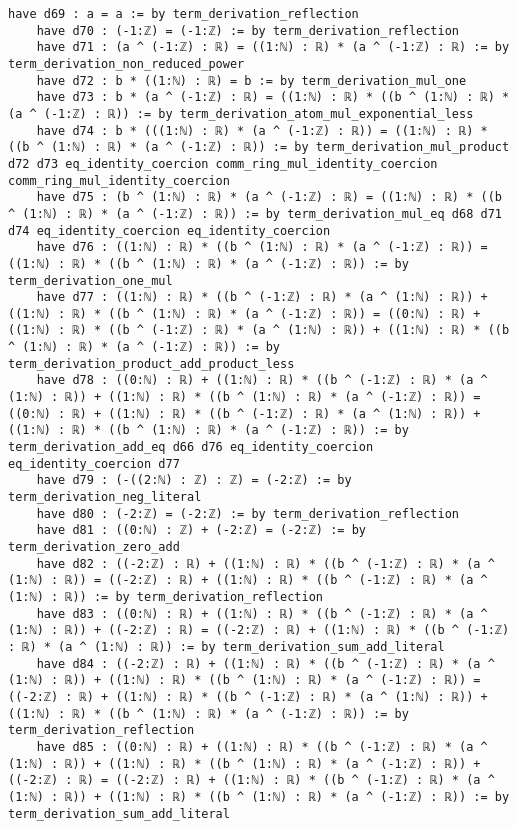 \documentclass{article}
\begin{document}
\begin{tcolorbox}[colback=white!10, width=\linewidth]
\begin{lstlisting}[language=Lean4]
    have d69 : a = a := by term_derivation_reflection
    have d70 : (-1:ℤ) = (-1:ℤ) := by term_derivation_reflection
    have d71 : (a ^ (-1:ℤ) : ℝ) = ((1:ℕ) : ℝ) * (a ^ (-1:ℤ) : ℝ) := by term_derivation_non_reduced_power
    have d72 : b * ((1:ℕ) : ℝ) = b := by term_derivation_mul_one
    have d73 : b * (a ^ (-1:ℤ) : ℝ) = ((1:ℕ) : ℝ) * ((b ^ (1:ℕ) : ℝ) * (a ^ (-1:ℤ) : ℝ)) := by term_derivation_atom_mul_exponential_less
    have d74 : b * (((1:ℕ) : ℝ) * (a ^ (-1:ℤ) : ℝ)) = ((1:ℕ) : ℝ) * ((b ^ (1:ℕ) : ℝ) * (a ^ (-1:ℤ) : ℝ)) := by term_derivation_mul_product d72 d73 eq_identity_coercion comm_ring_mul_identity_coercion comm_ring_mul_identity_coercion
    have d75 : (b ^ (1:ℕ) : ℝ) * (a ^ (-1:ℤ) : ℝ) = ((1:ℕ) : ℝ) * ((b ^ (1:ℕ) : ℝ) * (a ^ (-1:ℤ) : ℝ)) := by term_derivation_mul_eq d68 d71 d74 eq_identity_coercion eq_identity_coercion
    have d76 : ((1:ℕ) : ℝ) * ((b ^ (1:ℕ) : ℝ) * (a ^ (-1:ℤ) : ℝ)) = ((1:ℕ) : ℝ) * ((b ^ (1:ℕ) : ℝ) * (a ^ (-1:ℤ) : ℝ)) := by term_derivation_one_mul
    have d77 : ((1:ℕ) : ℝ) * ((b ^ (-1:ℤ) : ℝ) * (a ^ (1:ℕ) : ℝ)) + ((1:ℕ) : ℝ) * ((b ^ (1:ℕ) : ℝ) * (a ^ (-1:ℤ) : ℝ)) = ((0:ℕ) : ℝ) + ((1:ℕ) : ℝ) * ((b ^ (-1:ℤ) : ℝ) * (a ^ (1:ℕ) : ℝ)) + ((1:ℕ) : ℝ) * ((b ^ (1:ℕ) : ℝ) * (a ^ (-1:ℤ) : ℝ)) := by term_derivation_product_add_product_less
    have d78 : ((0:ℕ) : ℝ) + ((1:ℕ) : ℝ) * ((b ^ (-1:ℤ) : ℝ) * (a ^ (1:ℕ) : ℝ)) + ((1:ℕ) : ℝ) * ((b ^ (1:ℕ) : ℝ) * (a ^ (-1:ℤ) : ℝ)) = ((0:ℕ) : ℝ) + ((1:ℕ) : ℝ) * ((b ^ (-1:ℤ) : ℝ) * (a ^ (1:ℕ) : ℝ)) + ((1:ℕ) : ℝ) * ((b ^ (1:ℕ) : ℝ) * (a ^ (-1:ℤ) : ℝ)) := by term_derivation_add_eq d66 d76 eq_identity_coercion eq_identity_coercion d77
    have d79 : (-((2:ℕ) : ℤ) : ℤ) = (-2:ℤ) := by term_derivation_neg_literal
    have d80 : (-2:ℤ) = (-2:ℤ) := by term_derivation_reflection
    have d81 : ((0:ℕ) : ℤ) + (-2:ℤ) = (-2:ℤ) := by term_derivation_zero_add
    have d82 : ((-2:ℤ) : ℝ) + ((1:ℕ) : ℝ) * ((b ^ (-1:ℤ) : ℝ) * (a ^ (1:ℕ) : ℝ)) = ((-2:ℤ) : ℝ) + ((1:ℕ) : ℝ) * ((b ^ (-1:ℤ) : ℝ) * (a ^ (1:ℕ) : ℝ)) := by term_derivation_reflection
    have d83 : ((0:ℕ) : ℝ) + ((1:ℕ) : ℝ) * ((b ^ (-1:ℤ) : ℝ) * (a ^ (1:ℕ) : ℝ)) + ((-2:ℤ) : ℝ) = ((-2:ℤ) : ℝ) + ((1:ℕ) : ℝ) * ((b ^ (-1:ℤ) : ℝ) * (a ^ (1:ℕ) : ℝ)) := by term_derivation_sum_add_literal
    have d84 : ((-2:ℤ) : ℝ) + ((1:ℕ) : ℝ) * ((b ^ (-1:ℤ) : ℝ) * (a ^ (1:ℕ) : ℝ)) + ((1:ℕ) : ℝ) * ((b ^ (1:ℕ) : ℝ) * (a ^ (-1:ℤ) : ℝ)) = ((-2:ℤ) : ℝ) + ((1:ℕ) : ℝ) * ((b ^ (-1:ℤ) : ℝ) * (a ^ (1:ℕ) : ℝ)) + ((1:ℕ) : ℝ) * ((b ^ (1:ℕ) : ℝ) * (a ^ (-1:ℤ) : ℝ)) := by term_derivation_reflection
    have d85 : ((0:ℕ) : ℝ) + ((1:ℕ) : ℝ) * ((b ^ (-1:ℤ) : ℝ) * (a ^ (1:ℕ) : ℝ)) + ((1:ℕ) : ℝ) * ((b ^ (1:ℕ) : ℝ) * (a ^ (-1:ℤ) : ℝ)) + ((-2:ℤ) : ℝ) = ((-2:ℤ) : ℝ) + ((1:ℕ) : ℝ) * ((b ^ (-1:ℤ) : ℝ) * (a ^ (1:ℕ) : ℝ)) + ((1:ℕ) : ℝ) * ((b ^ (1:ℕ) : ℝ) * (a ^ (-1:ℤ) : ℝ)) := by term_derivation_sum_add_literal

\end{lstlisting}
\end{tcolorbox}
\end{document}

